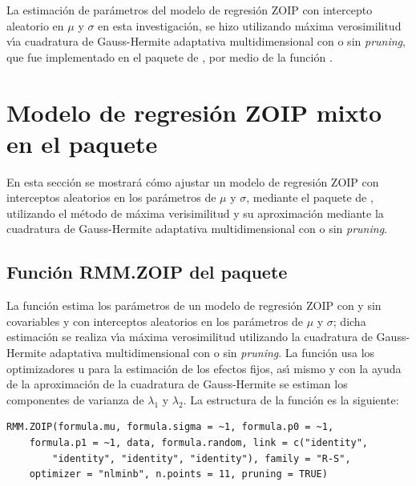 La estimaci\'{o}n de pa\-r\'{a}\-me\-tros del modelo de regresi\'{o}n ZOIP con intercepto aleatorio en $\mu$ y $\sigma$ en esta investigaci\'{o}n, se hizo utilizando m\'{a}xima verosimilitud v\'{\i}a cuadratura de Gauss-Hermite adaptativa multidimensional con o sin \textit{pruning}, que fue implementado en el paquete  de , por medio de la funci\'{o}n .


\section{Modelo de regresi\'{o}n ZOIP mixto en el paquete }

En esta secci\'{o}n se mostrar\'{a} c\'{o}mo ajustar un modelo de regresi\'{o}n ZOIP con interceptos aleatorios en los par\'{a}metros de $\mu$ y $\sigma$, mediante el paquete  de , utilizando el m\'{e}todo de m\'{a}xima verisimilitud y su aproximaci\'{o}n mediante la cuadratura de Gauss-Hermite adaptativa multidimensional con o sin \textit{pruning}.

\subsection{Funci\'{o}n RMM.ZOIP del paquete } 

La funci\'{o}n  estima los par\'{a}metros de un modelo de regresi\'{o}n ZOIP con y sin covariables y con interceptos aleatorios en los par\'{a}metros de $\mu$ y $\sigma$; dicha estimaci\'{o}n se realiza v\'{\i}a m\'{a}xima verosimilitud utilizando la cuadratura de Gauss-Hermite adaptativa multidimensional con o sin \textit{pruning}. La funci\'{o}n  usa los optimizadores  u  para la estimaci\'{o}n de los efectos fijos, as\'{\i} mismo y con la ayuda de la aproximaci\'{o}n de la cuadratura de Gauss-Hermite se estiman los componentes de varianza de $\lambda_1$ y $\lambda_2$. La estructura de la funci\'{o}n  es la siguiente:

\begin{verbatim}
RMM.ZOIP(formula.mu, formula.sigma = ~1, formula.p0 = ~1, 
    formula.p1 = ~1, data, formula.random, link = c("identity", 
        "identity", "identity", "identity"), family = "R-S", 
    optimizer = "nlminb", n.points = 11, pruning = TRUE)
\end{verbatim}

